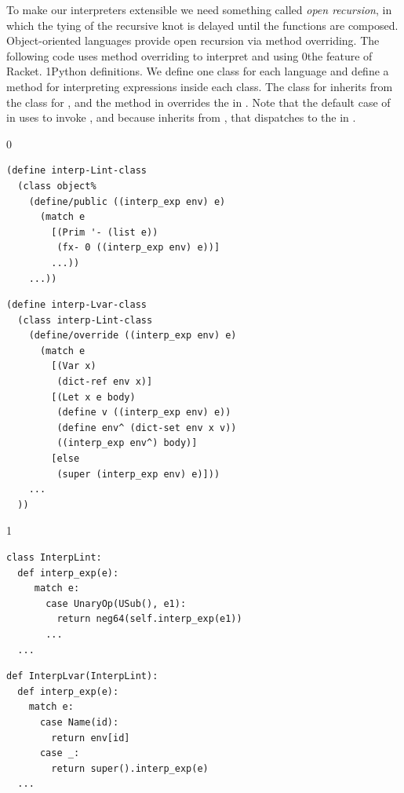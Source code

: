 \documentclass[7x10]{TimesAPriori_MIT}%
\def\racketEd{0}
\def\pythonEd{1}
\def\edition{1}
\newcommand{\racket}[1]{{\if\edition\racketEd{#1}\fi}}
\newcommand{\pythonColor}[0]{}
\newcommand{\python}[1]{{\if\edition\pythonEd\pythonColor #1\fi}}
\numberwithin{theorem}{chapter}
\numberwithin{definition}{chapter}
\numberwithin{equation}{chapter}
\begin{document}
To make our interpreters extensible we need something called
\emph{open recursion}, in which the
tying of the recursive knot is delayed until the functions are
composed. Object-oriented languages provide open recursion via method
overriding. The following code uses
method overriding to interpret \LangInt{} and \LangVar{} using
%
\racket{the
  \href{https://docs.racket-lang.org/guide/classes.html}{\code{class}}
  \index{subject}{class} feature of Racket.}%
%
\python{Python  definitions.}
%
We define one class for each language and define a method for
interpreting expressions inside each class. The class for \LangVar{}
inherits from the class for \LangInt{}, and the method
 in \LangVar{} overrides the  in
\LangInt{}. Note that the default case of  in
\LangVar{} uses  to invoke , and because
\LangVar{} inherits from \LangInt{}, that dispatches to the
 in \LangInt{}.
\begin{center}
  \hspace{-20pt}
{\if\edition\racketEd  
\begin{minipage}{0.45\textwidth}
\begin{lstlisting}
(define interp-Lint-class
  (class object%
    (define/public ((interp_exp env) e)
      (match e
        [(Prim '- (list e))
         (fx- 0 ((interp_exp env) e))]
        ...))
    ...))
\end{lstlisting}
\end{minipage}
\begin{minipage}{0.45\textwidth}
  \begin{lstlisting}
(define interp-Lvar-class
  (class interp-Lint-class
    (define/override ((interp_exp env) e)
      (match e
        [(Var x)
         (dict-ref env x)]
        [(Let x e body)
         (define v ((interp_exp env) e))
         (define env^ (dict-set env x v))
         ((interp_exp env^) body)]
        [else
         (super (interp_exp env) e)]))
    ...
  ))
\end{lstlisting}
\end{minipage}
\fi}
{\if\edition\pythonEd\pythonColor
\begin{minipage}{0.45\textwidth}
\begin{lstlisting}
class InterpLint:
  def interp_exp(e):
     match e:
       case UnaryOp(USub(), e1):
         return neg64(self.interp_exp(e1))
       ...
  ...
\end{lstlisting}
\end{minipage}
\begin{minipage}{0.45\textwidth}
  \begin{lstlisting}
def InterpLvar(InterpLint):
  def interp_exp(e):
    match e:
      case Name(id):
        return env[id]
      case _:
        return super().interp_exp(e)
  ...
\end{lstlisting}
\end{minipage}
\fi}
\end{center}
\end{document}
